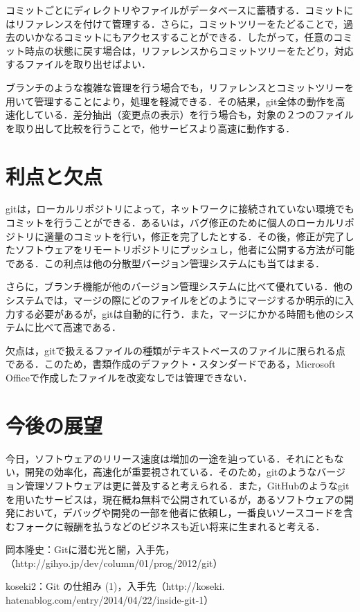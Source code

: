 \documentclass[a4j,9pt,twocolumn]{jsarticle}
\begin{document}
コミットごとにディレクトリやファイルがデータベースに蓄積する．コミットにはリファレンスを付けて管理する．さらに，コミットツリーをたどることで，過去のいかなるコミットにもアクセスすることができる．したがって，任意のコミット時点の状態に戻す場合は，リファレンスからコミットツリーをたどり，対応するファイルを取り出せばよい．

ブランチのような複雑な管理を行う場合でも，リファレンスとコミットツリーを用いて管理することにより，処理を軽減できる．その結果，git全体の動作を高速化している．差分抽出（変更点の表示）を行う場合も，対象の２つのファイルを取り出して比較を行うことで，他サービスより高速に動作する．

\section{利点と欠点}
gitは，ローカルリポジトリによって，ネットワークに接続されていない環境でもコミットを行うことができる．あるいは，バグ修正のために個人のローカルリポジトリに適量のコミットを行い，修正を完了したとする．その後，修正が完了したソフトウェアをリモートリポジトリにプッシュし，他者に公開する方法が可能である．この利点は他の分散型バージョン管理システムにも当てはまる．

さらに，ブランチ機能が他のバージョン管理システムに比べて優れている．他のシステムでは，マージの際にどのファイルをどのようにマージするか明示的に入力する必要があるが，gitは自動的に行う．また，マージにかかる時間も他のシステムに比べて高速である．

欠点は，gitで扱えるファイルの種類がテキストベースのファイルに限られる点である．このため，書類作成のデファクト・スタンダードである，Microsoft Officeで作成したファイルを改変なしでは管理できない．

\section{今後の展望}
今日，ソフトウェアのリリース速度は増加の一途を辿っている．それにともない，開発の効率化，高速化が重要視されている．そのため，gitのようなバージョン管理ソフトウェアは更に普及すると考えられる．また，GitHubのようなgitを用いたサービスは，現在概ね無料で公開されているが，あるソフトウェアの開発において，デバッグや開発の一部を他者に依頼し，一番良いソースコードを含むフォークに報酬を払うなどのビジネスも近い将来に生まれると考える．

\small
\begin{thebibliography}{99}
岡本隆史：Gitに潜む光と闇，入手先，（http://gihyo.jp/dev/column/01/prog/2012/git）

koseki2：Git の仕組み (1)，入手先（http://koseki.\\hatenablog.com/entry/2014/04/22/inside-git-1）
\end{thebibliography}
\end{document}

